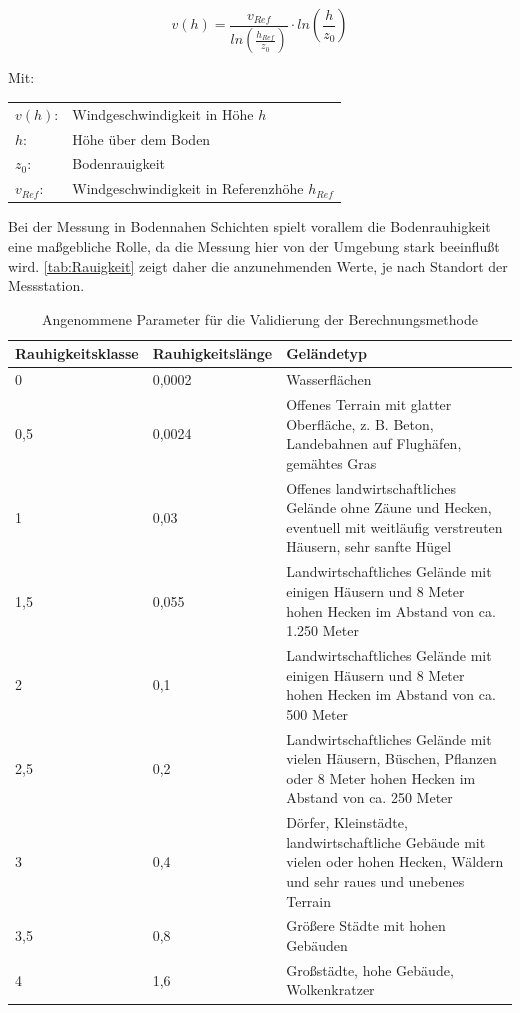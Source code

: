 \begin{equation}
	v(h) = \frac{v_{Ref}}{ln\left(\frac{h_{Ref}}{z_0}\right)} \cdot ln\left(\frac{h}{z_0}\right)
	\label{eq:log}
\end{equation}

Mit:

\begin{flushleft}
	\begin{tabular}[htpb]{ll}
		$v(h)$: & Windgeschwindigkeit in Höhe $h$ \\
		$h$: & Höhe über dem Boden \\
		$z_0$: & Bodenrauigkeit \\
		$v_{Ref}$: & Windgeschwindigkeit in Referenzhöhe $h_{Ref}$ 
	\end{tabular}
\end{flushleft}

Bei der Messung in Bodennahen Schichten spielt vorallem die Bodenrauhigkeit eine maßgebliche Rolle, da die Messung hier von der Umgebung stark beeinflußt wird. \autoref{tab:Rauigkeit} zeigt daher die anzunehmenden Werte, je nach Standort der Messstation.  

\begin{table}[H]
	\begin{tabular}[htpb]{p{4cm}|p{3cm}|p{7cm}}
		\textbf{Rauhigkeitsklasse} & \textbf{Rauhigkeitslänge} & \textbf{Geländetyp} \\
		\hline
		0 & 0,0002 & Wasserflächen \\
		\hline
		0,5 & 0,0024 & Offenes Terrain mit glatter Oberfläche, z. B. Beton, Landebahnen auf Flughäfen, gemähtes Gras \\
		\hline
		1 & 0,03 & Offenes landwirtschaftliches Gelände ohne Zäune und Hecken, eventuell mit weitläufig verstreuten Häusern, sehr sanfte Hügel \\
		\hline
		1,5 & 0,055 & Landwirtschaftliches Gelände mit einigen Häusern und 8 Meter hohen Hecken im Abstand von ca. 1.250 Meter \\
		\hline
		2 & 0,1 & Landwirtschaftliches Gelände mit einigen Häusern und 8 Meter hohen Hecken im Abstand von ca. 500 Meter \\
		\hline
		2,5 & 0,2 & Landwirtschaftliches Gelände mit vielen Häusern, Büschen, Pflanzen oder 8 Meter hohen Hecken im Abstand von ca. 250 Meter \\
		\hline
		3 & 0,4 & Dörfer, Kleinstädte, landwirtschaftliche Gebäude mit vielen oder hohen Hecken, Wäldern und sehr raues und unebenes Terrain \\
		\hline
		3,5 & 0,8 & Größere Städte mit hohen Gebäuden \\
		\hline
		4 & 1,6 & Großstädte, hohe Gebäude, Wolkenkratzer \\
	\end{tabular}
\centering
\caption{Angenommene Parameter für die Validierung der Berechnungsmethode \cite{Rauigkeit}}
\label{tab:Rauigkeit}
\end{table}

